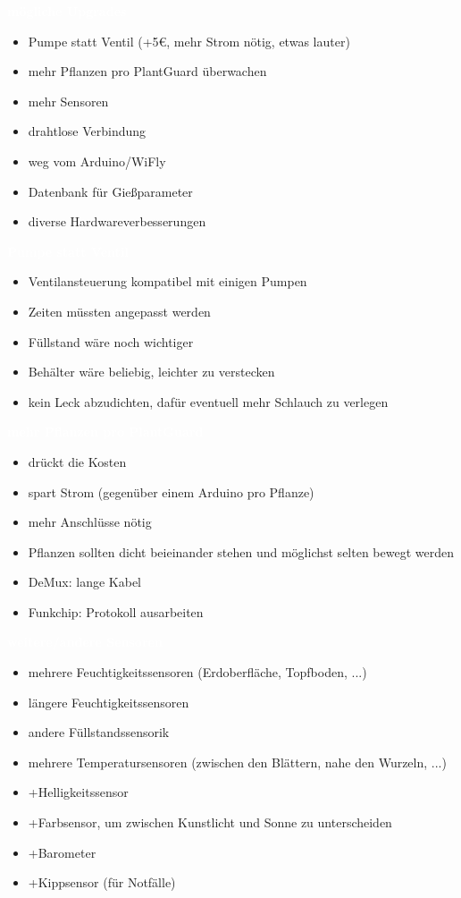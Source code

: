 \documentclass[bigger]{beamer}
\newcommand{\topic}[1]{{\huge{\textcolor{white}{\textbf{#1}}}}}
\begin{document}
\begin{frame}{\topic{mögliche Upgrades}}
	\begin{itemize}
		\item Pumpe statt Ventil (+{5\euro}, mehr Strom nötig, etwas lauter)
		\item mehr Pflanzen pro PlantGuard überwachen
		\item mehr Sensoren
		\item drahtlose Verbindung
		\item weg vom Arduino/WiFly
		\item Datenbank für Gießparameter
		\item diverse Hardwareverbesserungen
	\end{itemize}
\end{frame}

\begin{frame}{\topic{Pumpe statt Ventil}}
	\begin{itemize}
		\item Ventilansteuerung kompatibel mit einigen Pumpen
		\item Zeiten müssten angepasst werden
		\item Füllstand wäre noch wichtiger
		\item Behälter wäre beliebig, leichter zu verstecken
		\item kein Leck abzudichten, dafür eventuell mehr Schlauch zu verlegen
	\end{itemize}
\end{frame}

\begin{frame}{\topic{mehr Pflanzen pro PlantGuard}}
	\begin{itemize}
		\item drückt die Kosten
		\item spart Strom (gegenüber einem Arduino pro Pflanze)
		\item mehr Anschlüsse nötig
      \item Pflanzen sollten dicht beieinander stehen und möglichst selten bewegt werden
		\item DeMux: lange Kabel
		\item Funkchip: Protokoll ausarbeiten
	\end{itemize}
\end{frame}

\begin{frame}{\topic{weitere/andere Sensoren}}
	\begin{itemize}
		\item mehrere Feuchtigkeitssensoren (Erdoberfläche, Topfboden, ...)
		\item längere Feuchtigkeitssensoren
		\item andere Füllstandssensorik
		\item mehrere Temperatursensoren (zwischen den Blättern, nahe den Wurzeln, ...)
      \item +Helligkeitssensor
		\item +Farbsensor, um zwischen Kunstlicht und Sonne zu unterscheiden
		\item +Barometer
		\item +Kippsensor (für Notfälle)
	\end{itemize}
\end{frame}
\end{document}
